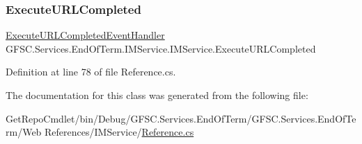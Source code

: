 \subsubsection{\texorpdfstring{Execute\+U\+R\+L\+Completed}{ExecuteURLCompleted}}
{\footnotesize\ttfamily \mbox{\hyperlink{namespace_g_f_s_c_1_1_services_1_1_end_of_term_1_1_i_m_service_af61025d4aca051465e8b8968b284e3d8}{Execute\+U\+R\+L\+Completed\+Event\+Handler}} G\+F\+S\+C.\+Services.\+End\+Of\+Term.\+I\+M\+Service.\+I\+M\+Service.\+Execute\+U\+R\+L\+Completed}







Definition at line 78 of file Reference.\+cs.



The documentation for this class was generated from the following file\+:\begin{DoxyCompactItemize}
\item 
Get\+Repo\+Cmdlet/bin/\+Debug/\+G\+F\+S\+C.\+Services.\+End\+Of\+Term/\+G\+F\+S\+C.\+Services.\+End\+Of\+Term/\+Web References/\+I\+M\+Service/\mbox{\hyperlink{_reference_8cs}{Reference.\+cs}}\end{DoxyCompactItemize}
